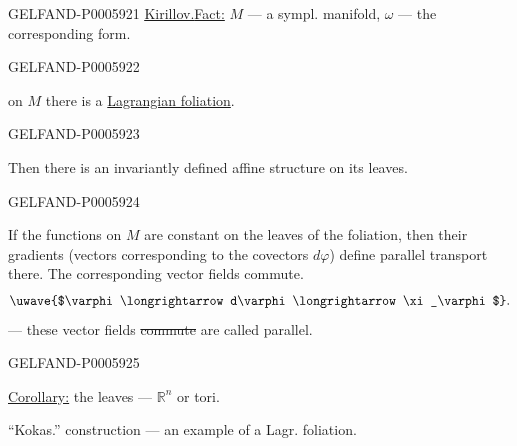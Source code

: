 \begin{GelfandAdjacentEvidence}{GELFAND-P000592}{1}
\underline{\underline{Kirillov.}}\quad \underline{Fact:}
\(M\) — a sympl. manifold, \(\omega\) — the corresponding form.
\end{GelfandAdjacentEvidence}
\begin{GelfandAdjacentEvidence}{GELFAND-P000592}{2}


on \(M\) there is a \underline{Lagrangian foliation}.
\end{GelfandAdjacentEvidence}
\begin{GelfandAdjacentEvidence}{GELFAND-P000592}{3}

Then there is an invariantly defined affine structure on its leaves.
\end{GelfandAdjacentEvidence}
\begin{GelfandAdjacentEvidence}{GELFAND-P000592}{4}


If the functions on \(M\) are constant on the leaves of the foliation, then their gradients
(vectors corresponding to the covectors \(d\varphi\)) define parallel transport there.
The corresponding vector fields commute.
\[
\text{\uwave{$\varphi\longrightarrow d\varphi\longrightarrow\xi_\varphi$}}.
\]
— these vector fields \sout{commute} are called parallel.
\end{GelfandAdjacentEvidence}
\begin{GelfandAdjacentEvidence}{GELFAND-P000592}{5}


\underline{Corollary:} the leaves — \(\mathbb R^n\) or tori.

“Kokas.” construction — an example of a Lagr. foliation.
\end{GelfandAdjacentEvidence}
